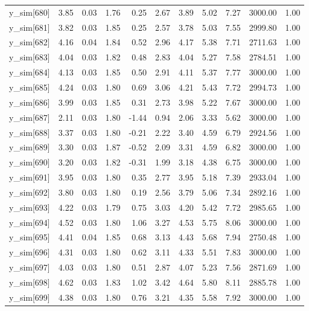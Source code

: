 \begin{table}[ht]
\begin{tabular}{rrrrrrrrrrr}
  y\_sim[680] & 3.85 & 0.03 & 1.76 & 0.25 & 2.67 & 3.89 & 5.02 & 7.27 & 3000.00 & 1.00 \\ 
  y\_sim[681] & 3.82 & 0.03 & 1.85 & 0.25 & 2.57 & 3.78 & 5.03 & 7.55 & 2999.80 & 1.00 \\ 
  y\_sim[682] & 4.16 & 0.04 & 1.84 & 0.52 & 2.96 & 4.17 & 5.38 & 7.71 & 2711.63 & 1.00 \\ 
  y\_sim[683] & 4.04 & 0.03 & 1.82 & 0.48 & 2.83 & 4.04 & 5.27 & 7.58 & 2784.51 & 1.00 \\ 
  y\_sim[684] & 4.13 & 0.03 & 1.85 & 0.50 & 2.91 & 4.11 & 5.37 & 7.77 & 3000.00 & 1.00 \\ 
  y\_sim[685] & 4.24 & 0.03 & 1.80 & 0.69 & 3.06 & 4.21 & 5.43 & 7.72 & 2994.73 & 1.00 \\ 
  y\_sim[686] & 3.99 & 0.03 & 1.85 & 0.31 & 2.73 & 3.98 & 5.22 & 7.67 & 3000.00 & 1.00 \\ 
  y\_sim[687] & 2.11 & 0.03 & 1.80 & -1.44 & 0.94 & 2.06 & 3.33 & 5.62 & 3000.00 & 1.00 \\ 
  y\_sim[688] & 3.37 & 0.03 & 1.80 & -0.21 & 2.22 & 3.40 & 4.59 & 6.79 & 2924.56 & 1.00 \\ 
  y\_sim[689] & 3.30 & 0.03 & 1.87 & -0.52 & 2.09 & 3.31 & 4.59 & 6.82 & 3000.00 & 1.00 \\ 
  y\_sim[690] & 3.20 & 0.03 & 1.82 & -0.31 & 1.99 & 3.18 & 4.38 & 6.75 & 3000.00 & 1.00 \\ 
  y\_sim[691] & 3.95 & 0.03 & 1.80 & 0.35 & 2.77 & 3.95 & 5.18 & 7.39 & 2933.04 & 1.00 \\ 
  y\_sim[692] & 3.80 & 0.03 & 1.80 & 0.19 & 2.56 & 3.79 & 5.06 & 7.34 & 2892.16 & 1.00 \\ 
  y\_sim[693] & 4.22 & 0.03 & 1.79 & 0.75 & 3.03 & 4.20 & 5.42 & 7.72 & 2985.65 & 1.00 \\ 
  y\_sim[694] & 4.52 & 0.03 & 1.80 & 1.06 & 3.27 & 4.53 & 5.75 & 8.06 & 3000.00 & 1.00 \\ 
  y\_sim[695] & 4.41 & 0.04 & 1.85 & 0.68 & 3.13 & 4.43 & 5.68 & 7.94 & 2750.48 & 1.00 \\ 
  y\_sim[696] & 4.31 & 0.03 & 1.80 & 0.62 & 3.11 & 4.33 & 5.51 & 7.83 & 3000.00 & 1.00 \\ 
  y\_sim[697] & 4.03 & 0.03 & 1.80 & 0.51 & 2.87 & 4.07 & 5.23 & 7.56 & 2871.69 & 1.00 \\ 
  y\_sim[698] & 4.62 & 0.03 & 1.83 & 1.02 & 3.42 & 4.64 & 5.80 & 8.11 & 2885.78 & 1.00 \\ 
  y\_sim[699] & 4.38 & 0.03 & 1.80 & 0.76 & 3.21 & 4.35 & 5.58 & 7.92 & 3000.00 & 1.00 \\ 

\end{tabular}
\end{table}
